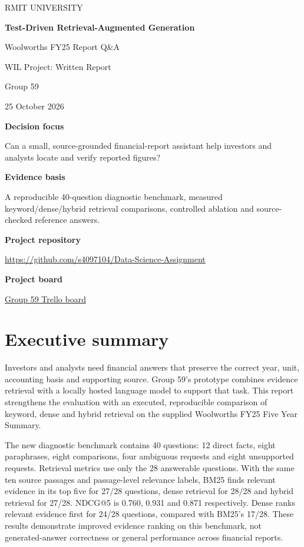\documentclass[11pt,a4paper]{article}
\begin{document}
\begin{titlepage}
\vspace*{22mm}
{\color{forest}\Large RMIT UNIVERSITY\par}
\vspace{10mm}
{\huge\bfseries Test-Driven Retrieval-Augmented Generation\par}
\vspace{6mm}
{\LARGE Woolworths FY25 Report Q\&A\par}
\vspace{7mm}
{\large WIL Project: Written Report\par Group 59\par 25 October 2026\par}
\vspace{15mm}
\textbf{Decision focus}\par
Can a small, source-grounded financial-report assistant help investors and analysts locate and verify reported figures?\par
\vspace{8mm}
\textbf{Evidence basis}\par
A reproducible 40-question diagnostic benchmark, measured keyword/dense/hybrid retrieval comparisons, controlled ablation and source-checked reference answers.\par


\vfill
\textbf{Project repository}\par
\url{https://github.com/s4097104/Data-Science-Assignment}\par
\textbf{Project board}\par
\href{https://trello.com/b/8Gf3ZILx/wil-project-group-59}{Group 59 Trello board}
\end{titlepage}

\section*{Executive summary}
Investors and analysts need financial answers that preserve the correct year, unit, accounting basis and supporting source. Group 59's prototype combines evidence retrieval with a locally hosted language model to support that task. This report strengthens the evaluation with an executed, reproducible comparison of keyword, dense and hybrid retrieval on the supplied Woolworths FY25 Five Year Summary.

The new diagnostic benchmark contains 40 questions: 12 direct facts, eight paraphrases, eight comparisons, four ambiguous requests and eight unsupported requests. Retrieval metrics use only the 28 answerable questions. With the same ten source passages and passage-level relevance labels, BM25 finds relevant evidence in its top five for 27/28 questions, dense retrieval for 28/28 and hybrid retrieval for 27/28. NDCG@5 is 0.760, 0.931 and 0.871 respectively. Dense ranks relevant evidence first for 24/28 questions, compared with BM25's 17/28. These results demonstrate improved evidence ranking on this benchmark, not generated-answer correctness or general performance across financial reports.
\end{document}
